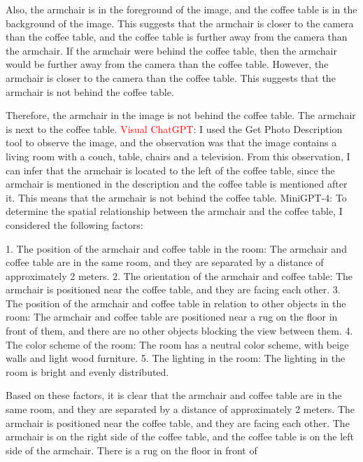 \begin{enumerate}
    Also, the armchair is in the foreground of the image, and the coffee table is in the background of the image. This suggests that the armchair is closer to the camera than the coffee table, and the coffee table is further away from the camera than the armchair. If the armchair were behind the coffee table, then the armchair would be further away from the camera than the coffee table. However, the armchair is closer to the camera than the coffee table. This suggests that the armchair is not behind the coffee table.
    
    Therefore, the armchair in the image is not behind the coffee table. The armchair is next to the coffee table.
    \subitem \textcolor{red}{Visual ChatGPT}: I used the Get Photo Description tool to observe the image, and the observation was that the image contains a living room with a couch, table, chairs and a television. From this observation, I can infer that the armchair is located to the left of the coffee table, since the armchair is mentioned in the description and the coffee table is mentioned after it. This means that the armchair is not behind the coffee table.
    \subitem MiniGPT-4: To determine the spatial relationship between the armchair and the coffee table, I considered the following factors:

    1. The position of the armchair and coffee table in the room: The armchair and coffee table are in the same room, and they are separated by a distance of approximately 2 meters.
    2. The orientation of the armchair and coffee table: The armchair is positioned near the coffee table, and they are facing each other.
    3. The position of the armchair and coffee table in relation to other objects in the room: The armchair and coffee table are positioned near a rug on the floor in front of them, and there are no other objects blocking the view between them.
    4. The color scheme of the room: The room has a neutral color scheme, with beige walls and light wood furniture.
    5. The lighting in the room: The lighting in the room is bright and evenly distributed.
    
    Based on these factors, it is clear that the armchair and coffee table are in the same room, and they are separated by a distance of approximately 2 meters. The armchair is positioned near the coffee table, and they are facing each other. The armchair is on the right side of the coffee table, and the coffee table is on the left side of the armchair. There is a rug on the floor in front of
\end{enumerate}
